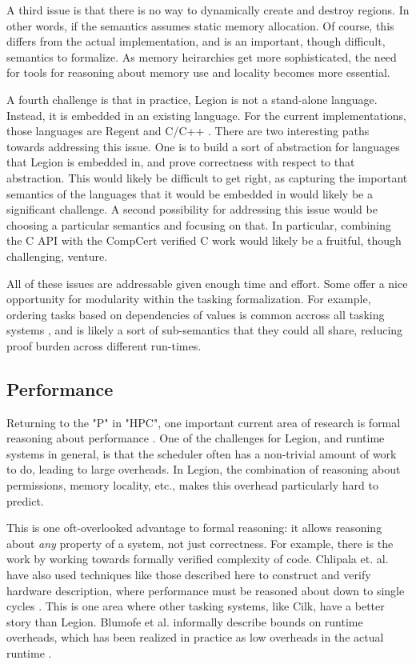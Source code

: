 \documentclass[sigconf]{acmart}
\begin{document}
A third issue is that there is no way to dynamically create and destroy
regions. In other words, if the semantics assumes static memory allocation.
Of course, this differs from the actual implementation, and is an important,
though difficult, semantics to formalize. As memory heirarchies get more 
sophisticated, the need for tools for reasoning about memory use and locality
becomes more essential. 

A fourth challenge is that in practice, Legion is not a stand-alone language.
Instead, it is embedded in an existing language. For the current implementations, 
those languages are Regent and C/C++ \cite{slaughter2015regent}. There are two 
interesting paths towards addressing this issue. One is to build a sort of
abstraction for languages that Legion is embedded in, and prove correctness
with respect to that abstraction. This would likely be difficult to get right,
as capturing the important semantics of the languages that it would be embedded
in would likely be a significant challenge. A second possibility for addressing
this issue would be choosing a particular semantics and focusing on that. In
particular, combining the C API with the CompCert verified C work would likely
be a fruitful, though challenging, venture. 

All of these issues are addressable given enough time and effort. Some offer a
nice opportunity for modularity within the tasking formalization. For example,
ordering tasks based on dependencies of values is common accross all tasking
systems \cite{blumofe1995cilk, kaiser2014hpx}, and is likely a sort of
sub-semantics that they could all share, reducing proof burden across different
run-times.

\subsection{Performance}

Returning to the "P" in "HPC", one important current area of research is formal
reasoning about performance \cite{mccarthy2017coq, chargueraud2015machine}. One
of the challenges for Legion, and runtime systems in general, is that the
scheduler often has a non-trivial amount of work to do, leading to large
overheads. In Legion, the combination of reasoning about permissions, memory
locality, etc., makes this overhead particularly hard to predict. 

This is one oft-overlooked advantage to formal reasoning: it allows reasoning
about \emph{any} property of a system, not just correctness. For example, there
is the work by \cite{mccarthy2017coq} working towards formally verified
complexity of code.  Chlipala et. al. have also used techniques like those
described here to construct and verify hardware description, where performance
must be reasoned about down to single cycles \cite{braibant2013formal}.  This
is one area where other tasking systems, like Cilk, have a better story than
Legion. Blumofe et al. informally describe bounds on runtime overheads, which
has been realized in practice as low overheads in the actual runtime
\cite{blumofe1995cilk}. 
\end{document}
